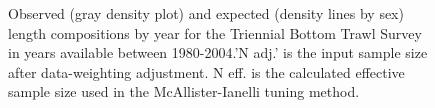 \documentclass[
]{scrartcl}
\begin{document}
\begin{figure}[H]


\caption{\label{fig-len-fit-tri}Observed (gray density plot) and
expected (density lines by sex) length compositions by year for the
Triennial Bottom Trawl Survey in years available between 1980-2004.'N
adj.' is the input sample size after data-weighting adjustment. N eff.
is the calculated effective sample size used in the McAllister-Ianelli
tuning method.}

\end{figure}%
\end{document}
